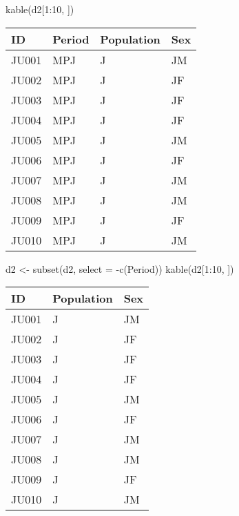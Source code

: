 \documentclass[
  letterpaper,
  DIV=11,
  numbers=noendperiod]{scrartcl}
\newenvironment{Shaded}{\begin{snugshade}}{\end{snugshade}}
\newcommand{\AttributeTok}[1]{\textcolor[rgb]{0.40,0.45,0.13}{#1}}
\newcommand{\DecValTok}[1]{\textcolor[rgb]{0.68,0.00,0.00}{#1}}
\newcommand{\FunctionTok}[1]{\textcolor[rgb]{0.28,0.35,0.67}{#1}}
\newcommand{\NormalTok}[1]{\textcolor[rgb]{0.00,0.23,0.31}{#1}}
\newcommand{\OtherTok}[1]{\textcolor[rgb]{0.00,0.23,0.31}{#1}}
\newcommand{\SpecialCharTok}[1]{\textcolor[rgb]{0.37,0.37,0.37}{#1}}
\begin{document}
\begin{Shaded}
\begin{Highlighting}[]
\FunctionTok{kable}\NormalTok{(d2[}\DecValTok{1}\SpecialCharTok{:}\DecValTok{10}\NormalTok{, ])}
\end{Highlighting}
\end{Shaded}

\begin{longtable}[]{@{}llll@{}}
\toprule()
ID & Period & Population & Sex \\
\midrule()
\endhead
JU001 & MPJ & J & JM \\
JU002 & MPJ & J & JF \\
JU003 & MPJ & J & JF \\
JU004 & MPJ & J & JF \\
JU005 & MPJ & J & JM \\
JU006 & MPJ & J & JF \\
JU007 & MPJ & J & JM \\
JU008 & MPJ & J & JM \\
JU009 & MPJ & J & JF \\
JU010 & MPJ & J & JM \\
\bottomrule()
\end{longtable}

\begin{Shaded}
\begin{Highlighting}[]
\NormalTok{d2 }\OtherTok{\textless{}{-}} \FunctionTok{subset}\NormalTok{(d2, }\AttributeTok{select =} \SpecialCharTok{{-}}\FunctionTok{c}\NormalTok{(Period))}
\FunctionTok{kable}\NormalTok{(d2[}\DecValTok{1}\SpecialCharTok{:}\DecValTok{10}\NormalTok{, ])}
\end{Highlighting}
\end{Shaded}

\begin{longtable}[]{@{}lll@{}}
\toprule()
ID & Population & Sex \\
\midrule()
\endhead
JU001 & J & JM \\
JU002 & J & JF \\
JU003 & J & JF \\
JU004 & J & JF \\
JU005 & J & JM \\
JU006 & J & JF \\
JU007 & J & JM \\
JU008 & J & JM \\
JU009 & J & JF \\
JU010 & J & JM \\
\bottomrule()
\end{longtable}
\end{document}

